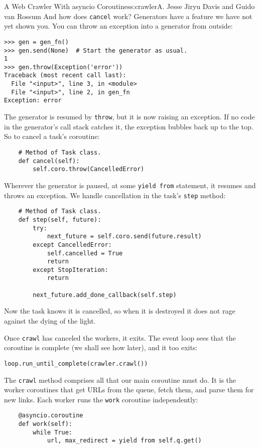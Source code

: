 \begin{aosachapter}{A Web Crawler With asyncio Coroutines}{s:crawler}{A. Jesse Jiryu Davis and Guido van Rossum}
And how does \texttt{cancel} work? Generators have a feature we have not
yet shown you. You can throw an exception into a generator from outside:

\begin{verbatim}
>>> gen = gen_fn()
>>> gen.send(None)  # Start the generator as usual.
1
>>> gen.throw(Exception('error'))
Traceback (most recent call last):
  File "<input>", line 3, in <module>
  File "<input>", line 2, in gen_fn
Exception: error
\end{verbatim}

The generator is resumed by \texttt{throw}, but it is now raising an
exception. If no code in the generator's call stack catches it, the
exception bubbles back up to the top. So to cancel a task's coroutine:

\begin{verbatim}
    # Method of Task class.
    def cancel(self):
        self.coro.throw(CancelledError)
\end{verbatim}

Wherever the generator is paused, at some \texttt{yield from} statement,
it resumes and throws an exception. We handle cancellation in the task's
\texttt{step} method:

\begin{verbatim}
    # Method of Task class.
    def step(self, future):
        try:
            next_future = self.coro.send(future.result)
        except CancelledError:
            self.cancelled = True
            return
        except StopIteration:
            return

        next_future.add_done_callback(self.step)
\end{verbatim}

Now the task knows it is cancelled, so when it is destroyed it does not
rage against the dying of the light.

Once \texttt{crawl} has canceled the workers, it exits. The event loop
sees that the coroutine is complete (we shall see how later), and it too
exits:

\begin{verbatim}
loop.run_until_complete(crawler.crawl())
\end{verbatim}

The \texttt{crawl} method comprises all that our main coroutine must do.
It is the worker coroutines that get URLs from the queue, fetch them,
and parse them for new links. Each worker runs the \texttt{work}
coroutine independently:

\begin{verbatim}
    @asyncio.coroutine
    def work(self):
        while True:
            url, max_redirect = yield from self.q.get()


\end{verbatim}
\end{aosachapter}
